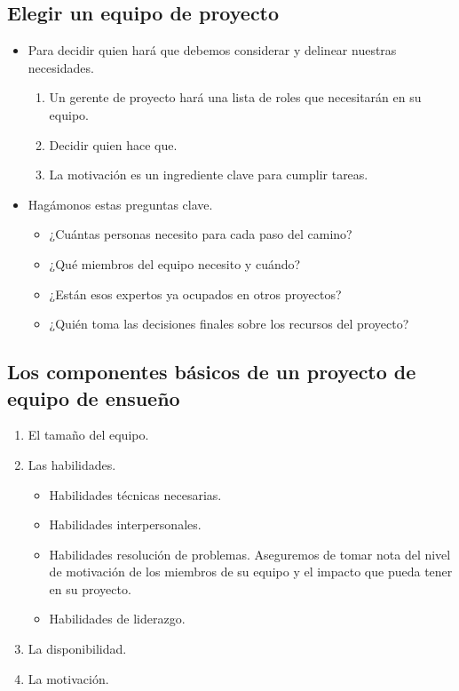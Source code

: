 \documentclass[10pt]{book}
\begin{document}
	\subsection{Elegir un equipo de proyecto}
	    
	    \begin{itemize}
		\item Para decidir quien hará que debemos considerar y delinear nuestras necesidades.
		    \begin{enumerate}
			\item Un gerente de proyecto hará una lista de roles que necesitarán en su equipo.
			\item Decidir quien hace que.
			\item La motivación es un ingrediente clave para cumplir tareas.
		    \end{enumerate}
		\item Hagámonos estas preguntas clave.
		    \begin{itemize}
			\item ¿Cuántas personas necesito para cada paso del camino?
			\item ¿Qué miembros del equipo necesito y cuándo?
			\item ¿Están esos expertos ya ocupados en otros proyectos?
			\item ¿Quién toma las decisiones finales sobre los recursos del proyecto?
		    \end{itemize}
	    \end{itemize}

	\subsection{Los componentes básicos de un proyecto de equipo de ensueño}
	    \begin{enumerate}
		\item El tamaño del equipo.
		\item Las habilidades.
		    \begin{itemize}
			\item Habilidades técnicas necesarias.
			\item Habilidades interpersonales.
			\item Habilidades resolución de problemas. Aseguremos de tomar nota del nivel de motivación de los miembros de su equipo y el impacto que pueda tener en su proyecto.
			\item Habilidades de liderazgo.
		    \end{itemize}
		\item La disponibilidad.
		\item La motivación.
	    \end{enumerate}
\end{document}
